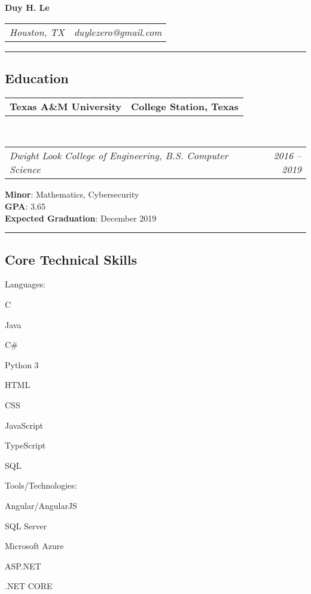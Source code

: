 \documentclass[10pt,letterpaper]{article}
\makeatletter
\newenvironment{indentsection}[1]%
{\begin{list}{}%
	{\setlength{\leftmargin}{#1}}%
	\item[]%
}
{\end{list}}
\newcommand{\headerrow}[2]
{\begin{tabular*}{\linewidth}{l@{\extracolsep{\fill}}r}
	#1 &
	#2 \\
\end{tabular*}}
\newcommand{\CPP}
{C\nolinebreak[4]\hspace{-.05em}\raisebox{.22ex}{\footnotesize\bf ++}}
\makeatother
\begin{document}
\begin{center}
{\LARGE \textbf{Duy H. Le}}
\end{center}
	\headerrow
		{\emph{Houston, TX}}
		{\emph{duylezero@gmail.com}}
\hrule
\vspace{-0.8em}
\subsection*{Education}

	\headerrow
		{\textbf{Texas A\&M University}}
		{\textbf{College Station, Texas}}
	\\
	\headerrow
		{\emph{Dwight Look College of Engineering, B.S. Computer Science}}
		{\emph{2016 -- 2019}}
	\begin{indentsection}{\parindent}
	\vspace{-0.4em}
		 \textbf{Minor}: Mathematics, Cybersecurity \\
		 \textbf{GPA}: 3.65 \\
		\textbf{Expected Graduation}: December 2019
	\end{indentsection}

\hrule
\vspace{-0.8em}
\subsection*{Core Technical Skills}
\vspace{-0.4em}
\begin{indentsection}{\parindent}
\begin{description*}
	\item[Languages:]
	\begin{inparaitem}[\ * \ ]
 		\CPP \ 
		\item Java
		\item C\#
		\item Python 3
		\item HTML
		\item CSS
		\item JavaScript
		\item TypeScript
		\item SQL
	\end{inparaitem}
	\item[Tools/Technologies:]
		\begin{inparaitem}[\ * \ ]
 		 Angular/AngularJS \
		\item SQL Server
		\item Microsoft Azure
		\item ASP.NET
		\item .NET CORE
	\end{inparaitem}
\end{description*}
\end{indentsection}
\end{document}
